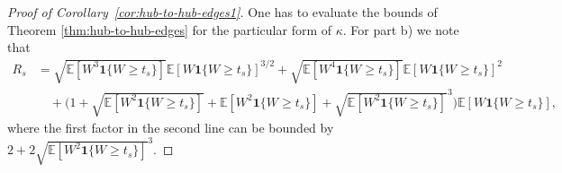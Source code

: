 \documentclass{article}
\theoremstyle{definition}
\numberwithin{equation}{section}
\theoremstyle{remark}
\begin{document}
\begin{proof}[Proof of Corollary~\ref{cor:hub-to-hub-edges1}]
One has to evaluate the bounds of Theorem \ref{thm:hub-to-hub-edges} for the particular form of $\kappa$. For part b) we note that
\begin{align*}
R_s & = \sqrt{\mathbb{E}[W^3 \mathbf{1}\{W\geq t_s\}]} \mathbb{E}[W \mathbf{1}\{W\geq t_s\}]^{3/2} + \sqrt{\mathbb{E}[W^4 \mathbf{1}\{W\geq t_s\}]} \mathbb{E}[W \mathbf{1}\{W\geq t_s\}]^2 \\
& \quad + \big( 1 + \sqrt{\mathbb{E}[W^2 \mathbf{1}\{W\geq t_s\}]} + \mathbb{E}[W^2 \mathbf{1}\{W\geq t_s\}] + \sqrt{\mathbb{E}[W^2 \mathbf{1}\{W\geq t_s\}]}^3\big) \mathbb{E}[W \mathbf{1}\{W\geq t_s\}],
\end{align*}
where the first factor in the second line can be bounded by $2+2\sqrt{\mathbb{E}[W^2 \mathbf{1}\{W\geq t_s\}]}^3$.
\end{proof}
\end{document}
